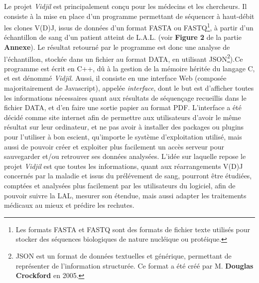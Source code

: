 \documentclass[pdftex,12pt,a4paper]{report}
\begin{document}
\begin{spacing}{1.2}
Le projet \textit{Vidjil} est principalement conçu pour les médecins et les chercheurs.
\newline 
Il consiste à la mise en place d'un programme permettant de séquencer à haut-débit les clones V(D)J, issus de données d'un format FASTA ou FASTQ\footnote{Les formats FASTA et FASTQ sont des formats de fichier texte utilisés pour stocker des séquences biologiques de nature nucléique ou protéique.}, à partir d'un échantillon de sang d'un patient atteint de L.A.L. (voir \textbf{Figure 2} de la partie \textbf{Annexe}). Le résultat retourné par le programme est donc une analyse de l'échantillon, stockée dans un fichier au format DATA, en utilisant JSON\footnote{JSON est un format de données textuelles et générique, permettant de représenter de l'information structurée. Ce format a été créé par M. \textbf{Douglas Crockford} en 2005.}).Ce programme est écrit en C++, dû à la gestion de la mémoire héritée du langage C, et est dénommé \textit{Vidjil}. Aussi, il consiste en une interface Web (composée majoritairement de Javascript), appelée \textit{interface}, dont le but est d'afficher toutes les informations nécessaires quant aux résultats de séquençage recueillis dans le fichier DATA, et d'en faire une sortie papier au format PDF. L'interface a été décidé comme site internet afin de permettre aux utilisateurs d'avoir le même résultat sur leur ordinateur, et ne pas avoir à installer des packages ou plugins pour l'utiliser à bon escient, qu'importe le système d'exploitation utilisé, mais aussi de pouvoir créer et exploiter plus facilement un accès serveur pour sauvegarder et/ou retrouver ses données analysées.
\newline
L'idée sur laquelle repose le projet \textit{Vidjil} est que toutes les informations, quant aux réarrangements V(D)J concernés par la maladie et issus du prélévement de sang, pourront être étudiées, comptées et analysées plus facilement par les utilisateurs du logiciel, afin de pouvoir suivre la LAL, mesurer son étendue, mais aussi adapter les traitements médicaux au mieux et prédire les rechutes.


\end{spacing}
\end{document}
